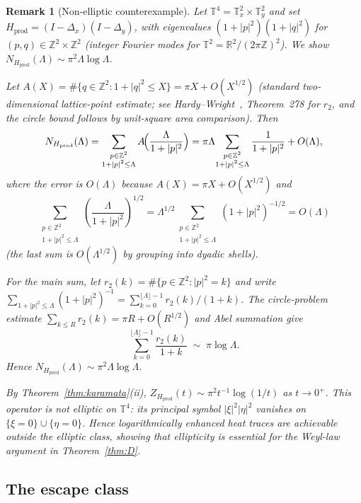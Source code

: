 \documentclass[12pt]{amsart}
\newtheorem{remark}[theorem]{Remark}
\newcommand{\RR}{\mathbb{R}}
\newcommand{\ZZ}{\mathbb{Z}}
\begin{document}
\begin{remark}[Non-elliptic counterexample]
\label{rem:counterex}
Let $\mathbb{T}^4=\mathbb{T}^2_x\times\mathbb{T}^2_y$ and set
$H_{\mathrm{prod}}=(I-\Delta_x)(I-\Delta_y)$, with eigenvalues
$(1+|p|^2)(1+|q|^2)$ for $(p,q)\in\ZZ^2\times\ZZ^2$
(integer Fourier modes for $\mathbb{T}^2=\RR^2/(2\pi\ZZ)^2$).
We show $N_{H_{\mathrm{prod}}}(\Lambda)\sim\pi^2\Lambda\log\Lambda$.

Let $A(X)=\#\{q\in\ZZ^2:1+|q|^2\le X\}=\pi X+O(X^{1/2})$
(standard two-dimensional lattice-point estimate; see
Hardy--Wright~\cite{HardyWright2008}, Theorem~278 for $r_2$, and the
circle bound follows by unit-square area comparison).  Then
\[
  N_{H_{\mathrm{prod}}}(\Lambda)
  =\sum_{\substack{p\in\ZZ^2\\1+|p|^2\le\Lambda}}
  A\!\Bigl(\frac{\Lambda}{1+|p|^2}\Bigr)
  =\pi\Lambda\!\sum_{\substack{p\in\ZZ^2\\1+|p|^2\le\Lambda}}
  \frac{1}{1+|p|^2}+O(\Lambda),
\]
where the error is $O(\Lambda)$ because $A(X)=\pi X+O(X^{1/2})$ and
\[
  \sum_{\substack{p\in\ZZ^2\\1+|p|^2\le\Lambda}}
  \!\!\!\left(\frac{\Lambda}{1+|p|^2}\right)^{\!1/2}
  =\Lambda^{1/2}\!\!\!\sum_{\substack{p\in\ZZ^2\\1+|p|^2\le\Lambda}}
  \!(1+|p|^2)^{-1/2}
  =O(\Lambda)
\]
(the last sum is $O(\Lambda^{1/2})$ by grouping into dyadic shells).

For the main sum, let $r_2(k)=\#\{p\in\ZZ^2:|p|^2=k\}$ and write
$\sum_{1+|p|^2\le\Lambda}(1+|p|^2)^{-1}=\sum_{k=0}^{\lfloor\Lambda\rfloor-1}r_2(k)/(1+k)$.
The circle-problem estimate $\sum_{k\le R}r_2(k)=\pi R+O(R^{1/2})$
and Abel summation give
\[
  \sum_{k=0}^{\lfloor\Lambda\rfloor-1}\frac{r_2(k)}{1+k}
  \;\sim\;\pi\log\Lambda.
\]
Hence $N_{H_{\mathrm{prod}}}(\Lambda)\sim\pi^2\Lambda\log\Lambda$.

By Theorem~\ref{thm:karamata}(ii),
$Z_{H_{\mathrm{prod}}}(t)\sim\pi^2 t^{-1}\log(1/t)$ as $t\to 0^+$.
This operator is \emph{not} elliptic on $\mathbb{T}^4$: its principal
symbol $|\xi|^2|\eta|^2$ vanishes on $\{\xi=0\}\cup\{\eta=0\}$.
Hence logarithmically enhanced heat traces are achievable outside the
elliptic class, showing that ellipticity is essential for the
Weyl-law argument in Theorem~\ref{thm:D}.
\end{remark}

\subsection*{The escape class}
\end{document}
